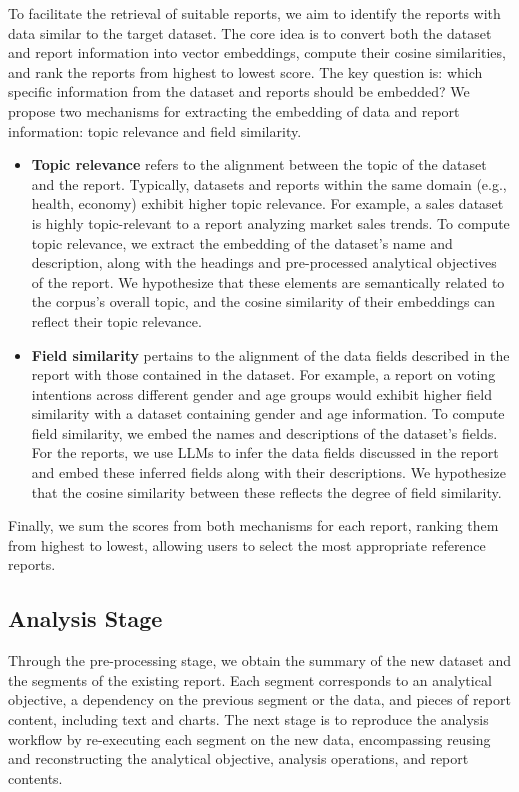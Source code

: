 To facilitate the retrieval of suitable reports, we aim to identify the reports with data similar to the target dataset. 
The core idea is to convert both the dataset and report information into vector embeddings, compute their cosine similarities, and rank the reports from highest to lowest score.
The key question is: which specific information from the dataset and reports should be embedded?
We propose two mechanisms for extracting the embedding of data and report information: topic relevance and field similarity.
\begin{itemize}
    \item \textbf{Topic relevance} refers to the alignment between the topic of the dataset and the report. 
    Typically, datasets and reports within the same domain (e.g., health, economy) exhibit higher topic relevance. 
    For example, a sales dataset is highly topic-relevant to a report analyzing market sales trends. 
    To compute topic relevance, we extract the embedding of the dataset’s name and description, along with the headings and pre-processed analytical objectives of the report. 
    We hypothesize that these elements are semantically related to the corpus's overall topic, and the cosine similarity of their embeddings can reflect their topic relevance.
    \item \textbf{Field similarity} pertains to the alignment of the data fields described in the report with those contained in the dataset. 
    For example, a report on voting intentions across different gender and age groups would exhibit higher field similarity with a dataset containing gender and age information. 
    To compute field similarity, we embed the names and descriptions of the dataset's fields. 
    For the reports, we use LLMs to infer the data fields discussed in the report and embed these inferred fields along with their descriptions. 
    We hypothesize that the cosine similarity between these reflects the degree of field similarity.
\end{itemize}
Finally, we sum the scores from both mechanisms for each report, ranking them from highest to lowest, allowing users to select the most appropriate reference reports.

\subsection{Analysis Stage}
\label{subsec:analysis_stage}

Through the pre-processing stage, we obtain the summary of the new dataset and the segments of the existing report. 
Each segment corresponds to an analytical objective, a dependency on the previous segment or the data, and pieces of report content, including text and charts. 
The next stage is to reproduce the analysis workflow by re-executing each segment on the new data, encompassing reusing and reconstructing the analytical objective, analysis operations, and report contents. 

